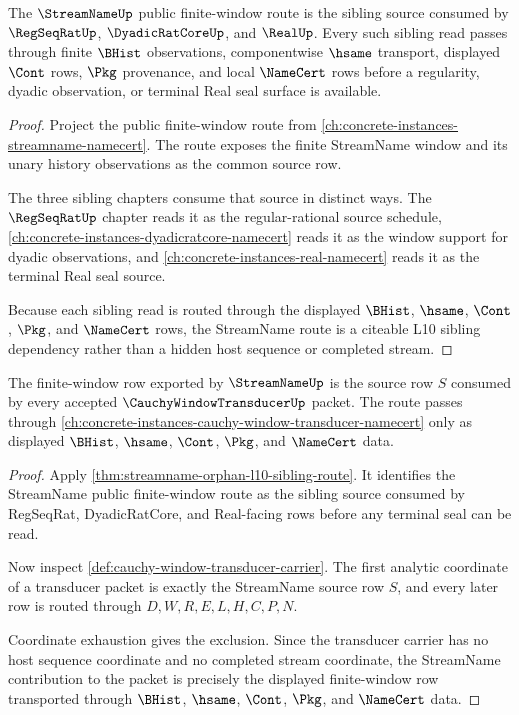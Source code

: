 \begin{theorem}
\label{thm:streamname-orphan-l10-sibling-route}
The $\StreamNameUp$ public finite-window route is the sibling source consumed
by $\RegSeqRatUp$, $\DyadicRatCoreUp$, and $\RealUp$. Every such sibling read
passes through finite $\BHist$ observations, componentwise $\hsame$ transport,
displayed $\Cont$ rows, $\Pkg$ provenance, and local $\NameCert$ rows before a
regularity, dyadic observation, or terminal Real seal surface is available.
\end{theorem}
\begin{proof}
Project the public finite-window route from
\autoref{ch:concrete-instances-streamname-namecert}. The route exposes the
finite StreamName window and its unary history observations as the common
source row.

The three sibling chapters consume that source in distinct ways. The
$\RegSeqRatUp$ chapter reads it as the regular-rational source schedule,
\autoref{ch:concrete-instances-dyadicratcore-namecert} reads it as the window
support for dyadic observations, and \autoref{ch:concrete-instances-real-namecert}
reads it as the terminal Real seal source.

Because each sibling read is routed through the displayed $\BHist$, $\hsame$,
$\Cont$, $\Pkg$, and $\NameCert$ rows, the StreamName route is a citeable L10
sibling dependency rather than a hidden host sequence or completed stream.
\end{proof}

\begin{theorem}
\label{thm:streamname-cauchy-window-transducer-source-route}
The finite-window row exported by $\StreamNameUp$ is the source row $S$ consumed by every accepted $\CauchyWindowTransducerUp$ packet. The route passes through \autoref{ch:concrete-instances-cauchy-window-transducer-namecert} only as displayed $\BHist$, $\hsame$, $\Cont$, $\Pkg$, and $\NameCert$ data.
\end{theorem}
\begin{proof}
Apply \autoref{thm:streamname-orphan-l10-sibling-route}. It identifies the StreamName public finite-window route as the sibling source consumed by RegSeqRat, DyadicRatCore, and Real-facing rows before any terminal seal can be read.

Now inspect \autoref{def:cauchy-window-transducer-carrier}. The first analytic coordinate of a transducer packet is exactly the StreamName source row $S$, and every later row is routed through $D,W,R,E,L,H,C,P,N$.

Coordinate exhaustion gives the exclusion. Since the transducer carrier has no host sequence coordinate and no completed stream coordinate, the StreamName contribution to the packet is precisely the displayed finite-window row transported through $\BHist$, $\hsame$, $\Cont$, $\Pkg$, and $\NameCert$ data.
\end{proof}
